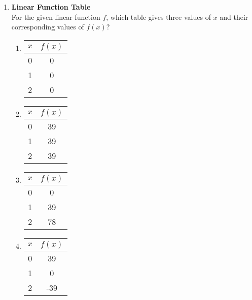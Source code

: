 \begin{enumerate}
\item \textbf{Linear Function Table}\\
For the given linear function $f$, which table gives three values of $x$ and their corresponding values of $f(x)$?
\begin{enumerate}[label=(\Alph*)]
  \item
  \begin{center}
  \begin{tabular}{|c|c|}
  \hline
  $x$ & $f(x)$ \\
  \hline
  0 & 0 \\
  \hline
  1 & 0 \\
  \hline
  2 & 0 \\
  \hline
  \end{tabular}
  \end{center}
  \item
  \begin{center}
  \begin{tabular}{|c|c|}
  \hline
  $x$ & $f(x)$ \\
  \hline
  0 & 39 \\
  \hline
  1 & 39 \\
  \hline
  2 & 39 \\
  \hline
  \end{tabular}
  \end{center}
  \item
  \begin{center}
  \begin{tabular}{|c|c|}
  \hline
  $x$ & $f(x)$ \\
  \hline
  0 & 0 \\
  \hline
  1 & 39 \\
  \hline
  2 & 78 \\
  \hline
  \end{tabular}
  \end{center}
  \item
  \begin{center}
  \begin{tabular}{|c|c|}
  \hline
  $x$ & $f(x)$ \\
  \hline
  0 & 39 \\
  \hline
  1 & 0 \\
  \hline
  2 & -39 \\
  \hline
  \end{tabular}
  \end{center}
\end{enumerate}
\begin{subanswer}
\end{subanswer}


\end{enumerate}
